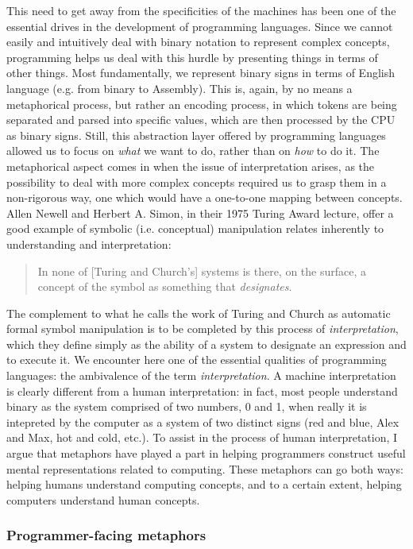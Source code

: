 \documentclass{article}
\begin{document}
This need to get away from the specificities of the machines has been one of the essential drives in the development of programming languages. Since we cannot easily and intuitively deal with binary notation to represent complex concepts, programming helps us deal with this hurdle by presenting things in terms of other things. Most fundamentally, we represent binary signs in terms of English language (e.g. from binary to Assembly). This is, again, by no means a metaphorical process, but rather an encoding process, in which tokens are being separated and parsed into specific values, which are then processed by the CPU as binary signs. Still, this abstraction layer offered by programming languages allowed us to focus on \emph{what} we want to do, rather than on \emph{how} to do it. The metaphorical aspect comes in when the issue of interpretation arises, as the possibility to deal with more complex concepts required us to grasp them in a non-rigorous way, one which would have a one-to-one mapping between concepts. Allen Newell and Herbert A. Simon, in their 1975 Turing Award lecture, offer a good example of symbolic (i.e. conceptual) manipulation relates inherently to understanding and interpretation:

\begin{quote}
  In none of [Turing and Church's] systems is there, on the surface, a concept of the symbol as something that \emph{designates}.
\end{quote}

The complement to what he calls the work of Turing and Church as automatic formal symbol manipulation is to be completed by this process of \emph{interpretation}, which they define simply as the ability of a system to designate an expression and to execute it. We encounter here one of the essential qualities of programming languages: the ambivalence of the term \emph{interpretation}. A machine interpretation is clearly different from a human interpretation: in fact, most people understand binary as the system comprised of two numbers, 0 and 1, when really it is intepreted by the computer as a system of two distinct signs (red and blue, Alex and Max, hot and cold, etc.). To assist in the process of human interpretation, I argue that metaphors have played a part in helping programmers construct useful mental representations related to computing. These metaphors can go both ways: helping humans understand computing concepts, and to a certain extent, helping computers understand human concepts.

\subsubsection{Programmer-facing metaphors}
\end{document}
